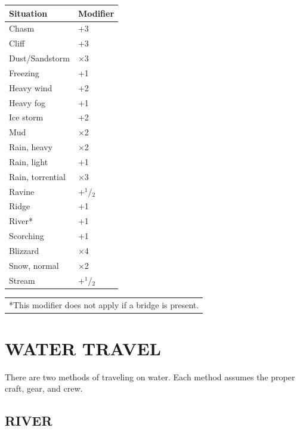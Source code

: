 \begin{multicols}{2}
\begin{minipage}{\columnwidth}
\label{obstacles}
\noindent
\begin{tabular}{|p{}|p{}|}
\hline
Situation				& Modifier \\
\hline\hline
\rowcolor[gray]{.9}Chasm			& +3 \\
Cliff			& +3 \\
\rowcolor[gray]{.9}Dust/Sandstorm	& $\times$3 \\
Freezing		& +1 \\
\rowcolor[gray]{.9}Heavy wind		& +2 \\
Heavy fog		& +1 \\
\rowcolor[gray]{.9}Ice storm		& +2 \\
Mud				& $\times$2 \\
\rowcolor[gray]{.9}Rain, heavy		& $\times$2 \\
Rain, light		& +1 \\
\rowcolor[gray]{.9}Rain, torrential	& $\times$3 \\
Ravine			& +$^1$/$_2$ \\
\rowcolor[gray]{.9}Ridge			& +1 \\
River*			& +1 \\
\rowcolor[gray]{.9}Scorching		& +1 \\
Blizzard		& $\times$4 \\
\rowcolor[gray]{.9}Snow, normal	& $\times$2 \\
Stream			& +$^1$/$_2$ \\
\hline
\end{tabular}
\noindent\begin{tabular}{p{}}
*This modifier does not apply if a bridge is present. \\
\end{tabular}\vspace{.5em}

\end{minipage}

\section{WATER TRAVEL}

There are two methods of traveling on water.  Each method assumes the proper craft, gear, and crew.

\subsection{RIVER}


\end{multicols}
